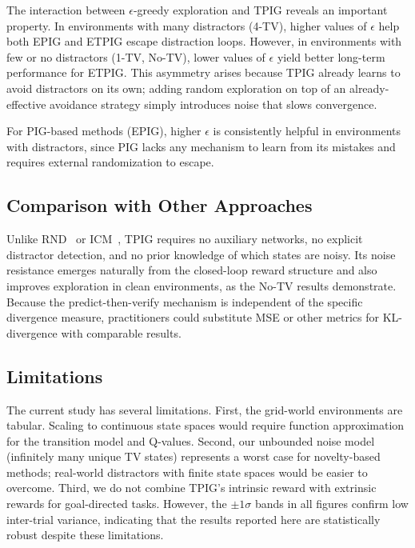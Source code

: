 \documentclass[letterpaper]{article} %
\begin{document}
The interaction between $\epsilon$-greedy exploration and TPIG
reveals an important property.  In environments with many distractors
(4-TV), higher values of $\epsilon$ help both EPIG and ETPIG escape
distraction loops.  However, in environments with few or no
distractors (1-TV, No-TV), lower values of $\epsilon$ yield better
long-term performance for ETPIG.  This asymmetry arises because TPIG
already learns to avoid distractors on its own; adding random
exploration on top of an already-effective avoidance strategy simply
introduces noise that slows convergence.

For PIG-based methods (EPIG), higher $\epsilon$ is consistently
helpful in environments with distractors, since PIG lacks any
mechanism to learn from its mistakes and requires external
randomization to escape.

\subsection{Comparison with Other Approaches}

Unlike RND~\cite{Burda2019RND} or ICM~\cite{Pathak2017ICM}, TPIG
requires no auxiliary networks, no explicit distractor detection, and
no prior knowledge of which states are noisy.  Its noise resistance
emerges naturally from the closed-loop reward structure and also
improves exploration in clean environments, as the No-TV results
demonstrate.  Because the predict-then-verify mechanism is independent
of the specific divergence measure, practitioners could substitute
MSE or other metrics for KL-divergence with comparable results.

\subsection{Limitations}

The current study has several limitations.  First, the grid-world
environments are tabular.  Scaling to continuous state spaces would
require function approximation for the transition model and Q-values.
Second, our unbounded noise model (infinitely many unique TV states)
represents a worst case for novelty-based methods; real-world
distractors with finite state spaces would be easier to overcome.
Third, we do not combine TPIG's intrinsic reward with extrinsic
rewards for goal-directed tasks.
However, the $\pm 1\sigma$ bands in all figures confirm low
inter-trial variance, indicating that the results reported here
are statistically robust despite these limitations.
\end{document}
